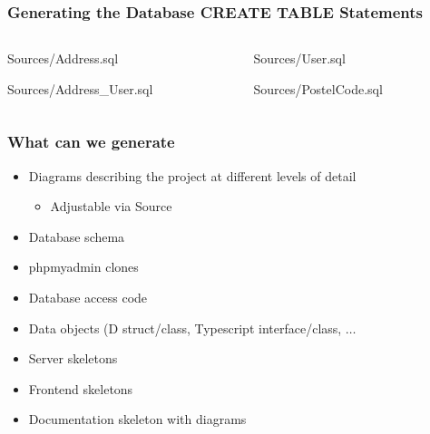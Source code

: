 \documentclass[xelatex,10pt]{beamer}
\begin{document}
\begin{frame}
	\frametitle{Generating the Database CREATE TABLE Statements}
\begin{columns}[T]
\begin{column}{0.49\linewidth}
	
	{Sources/Address.sql}
	
	{Sources/Address_User.sql}
\end{column}
\begin{column}{0.49\linewidth}
	
	{Sources/User.sql}
	
	{Sources/PostelCode.sql}
\end{column}
		
\end{columns}
\end{frame}

\begin{frame}
	\frametitle{What can we generate}
	\begin{itemize}
		\item Diagrams describing the project at different levels of detail
		\begin{itemize}
			\item Adjustable via Source
		\end{itemize}
		\item Database schema
		\item phpmyadmin clones
		\item Database access code
		\item Data objects (D struct/class, Typescript interface/class, \(\dots\)
		\item Server skeletons
		\item Frontend skeletons
		\item Documentation skeleton with diagrams
	\end{itemize}
\end{frame}
\end{document}
